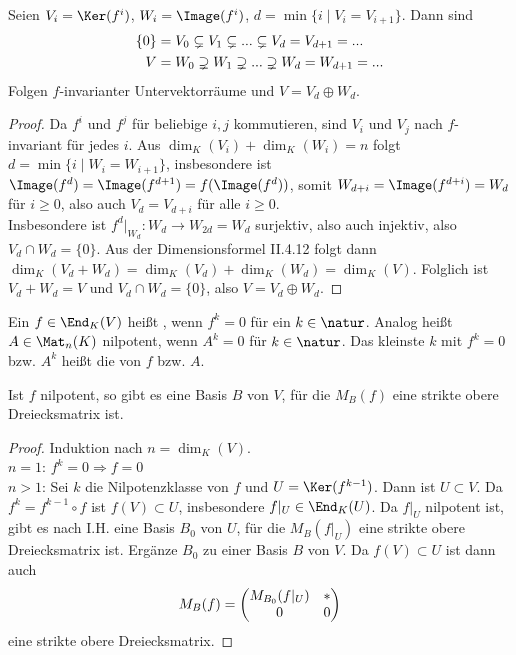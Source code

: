 \begin{proposition}
	Seien $V_i=\Ker(f^i)$, $W_i=\Image(f^i)$, $d=\min\{i\mid V_i=V_{i+1}\}$. Dann sind 
	\begin{align}
		\{0\}&=V_0\subsetneq V_1\subsetneq ...\subsetneq V_d=V_{d+1}=...\notag \\
		V&= W_0\supsetneq W_1\supsetneq ... \supsetneq W_d=W_{d+1}=...\notag
	\end{align}
	Folgen $f$-invarianter Untervektorräume und $V=V_d\oplus W_d$.
\end{proposition}
\begin{proof}
	Da $f^i$ und $f^j$ für beliebige $i,j$ kommutieren, sind $V_i$ und $V_j$ nach  $f$-invariant für jedes $i$. Aus $\dim_K(V_i)+\dim_K(W_i)=n$ folgt $d=\min\{i\mid W_i=W_{i+1}\}$, insbesondere ist $\Image(f^d)=\Image(f^{d+1})=f(\Image(f^d))$, somit $W_{d+i}=\Image(f^{d+i})=W_d$ für $i\ge 0$, also auch $V_d=V_{d+i}$ für alle $i\ge 0$. \\
	Insbesondere ist $f^d\vert_{W_d}:W_d\to W_{2d}=W_d$ surjektiv, also auch injektiv, also $V_d\cap W_d=\{0\}$. Aus der Dimensionsformel II.4.12 folgt dann $\dim_K(V_d+W_d)=\dim_K(V_d)+\dim_K(W_d)=\dim_K(V)$. Folglich ist $V_d+W_d=V$ und $V_d\cap W_d=\{0\}$, also $V=V_d\oplus W_d$.
\end{proof}

\begin{definition}[nilpotent]
	Ein $f\in\End_K(V)$ heißt , wenn $f^k=0$ für ein $k\in\natur$. Analog heißt $A\in\Mat_n(K)$ nilpotent, wenn $A^k=0$ für $k\in\natur$. Das kleinste $k$ mit $f^k=0$ bzw. $A^k$ heißt die  von $f$ bzw. $A$.
\end{definition}

\begin{lemma}
	Ist $f$ nilpotent, so gibt es eine Basis $B$ von $V$, für die $M_B(f)$ eine strikte obere Dreiecksmatrix ist.
\end{lemma}
\begin{proof}
	Induktion nach $n=\dim_K(V)$. \\
	\emph{$n=1$}: $f^k=0\Rightarrow f=0$ \\
	\emph{$n>1$}: Sei $k$ die Nilpotenzklasse von $f$ und $U=\Ker(f^{k-1})$. Dann ist $U\subset V$. Da $f^k=f^{k-1}\circ f$ ist $f(V)\subset U$, insbesondere $f\vert_U\in\End_K(U)$. Da $f\vert_U$ nilpotent ist, gibt es nach I.H. eine Basis $B_0$ von $U$, für die $M_B(f\vert_U)$ eine strikte obere Dreiecksmatrix ist. Ergänze $B_0$ zu einer Basis $B$ von $V$. Da $f(V)\subset U$ ist dann auch 
	\begin{align}
		M_B(f)=\begin{pmatrix}M_{B_0}(f\vert_U)&*\\0&0\end{pmatrix}\notag
	\end{align}
	eine strikte obere Dreiecksmatrix.
\end{proof}

